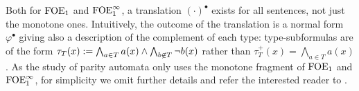 \begin{remark} Both for $\mathrm{FOE}_1$ and $\mathrm{FOE}^{\infty}_1$, a translation $(\cdot)^{\bullet}$ exists for all sentences, not just the monotone ones. Intuitively, the outcome of the translation is a normal form $\varphi^{\bullet}$ giving also a description of the complement of each type: type-subformulas are of the form $\tau_T(x) \mathrel{: =} \bigwedge_{a \in T} a(x) \wedge \bigwedge_{b \not\in T} \lnot b(x)$ rather than $\tau^{+}_T(x) = \bigwedge_{a \in T} a(x)$. As the study of parity automata only uses the monotone fragment of $\mathrm{FOE}_1$ and $\mathrm{FOE}^{\infty}_1$, for simplicity we omit further details and refer the interested reader to \cite{???}.\end{remark}


